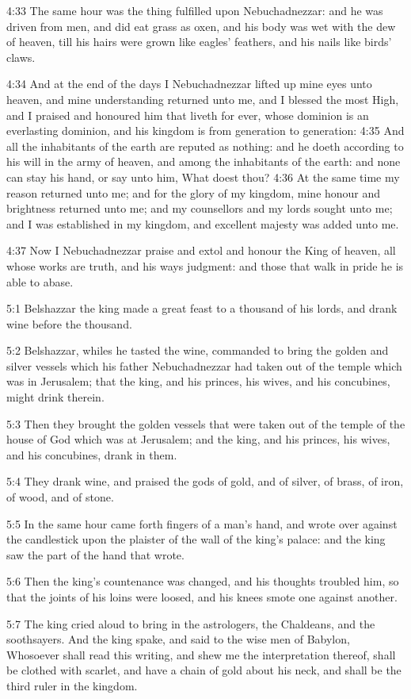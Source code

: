 4:33 The same hour was the thing fulfilled upon Nebuchadnezzar: and he was driven from men, and did eat grass as oxen, and his body was wet with the dew of heaven, till his hairs were grown like eagles' feathers, and his nails like birds' claws.

4:34 And at the end of the days I Nebuchadnezzar lifted up mine eyes unto heaven, and mine understanding returned unto me, and I blessed the most High, and I praised and honoured him that liveth for ever, whose dominion is an everlasting dominion, and his kingdom is from generation to generation: 4:35 And all the inhabitants of the earth are reputed as nothing: and he doeth according to his will in the army of heaven, and among the inhabitants of the earth: and none can stay his hand, or say unto him, What doest thou?  4:36 At the same time my reason returned unto me; and for the glory of my kingdom, mine honour and brightness returned unto me; and my counsellors and my lords sought unto me; and I was established in my kingdom, and excellent majesty was added unto me.

4:37 Now I Nebuchadnezzar praise and extol and honour the King of heaven, all whose works are truth, and his ways judgment: and those that walk in pride he is able to abase.

5:1 Belshazzar the king made a great feast to a thousand of his lords, and drank wine before the thousand.

5:2 Belshazzar, whiles he tasted the wine, commanded to bring the golden and silver vessels which his father Nebuchadnezzar had taken out of the temple which was in Jerusalem; that the king, and his princes, his wives, and his concubines, might drink therein.

5:3 Then they brought the golden vessels that were taken out of the temple of the house of God which was at Jerusalem; and the king, and his princes, his wives, and his concubines, drank in them.

5:4 They drank wine, and praised the gods of gold, and of silver, of brass, of iron, of wood, and of stone.

5:5 In the same hour came forth fingers of a man's hand, and wrote over against the candlestick upon the plaister of the wall of the king's palace: and the king saw the part of the hand that wrote.

5:6 Then the king's countenance was changed, and his thoughts troubled him, so that the joints of his loins were loosed, and his knees smote one against another.

5:7 The king cried aloud to bring in the astrologers, the Chaldeans, and the soothsayers. And the king spake, and said to the wise men of Babylon, Whosoever shall read this writing, and shew me the interpretation thereof, shall be clothed with scarlet, and have a chain of gold about his neck, and shall be the third ruler in the kingdom.


